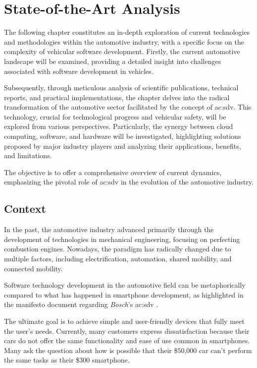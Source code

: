 
\chapter{State-of-the-Art Analysis} \label{ch:state-of-the-ArtAnalysis}
The following chapter constitutes an in-depth exploration of current technologies and methodologies within the automotive industry, with a specific focus on the complexity of vehicular software development. Firstly, the current automotive landscape will be examined, providing a detailed insight into challenges associated with software development in vehicles.

Subsequently, through meticulous analysis of scientific publications, technical reports, and practical implementations, the chapter delves into the radical transformation of the automotive sector facilitated by the concept of \gls{ac:sdv}. This technology, crucial for technological progress and vehicular safety, will be explored from various perspectives. Particularly, the synergy between cloud computing, software, and hardware will be investigated, highlighting solutions proposed by major industry players and analyzing their applications, benefits, and limitations.

The objective is to offer a comprehensive overview of current dynamics, emphasizing the pivotal role of \gls{ac:sdv} in the evolution of the automotive industry.

\section{Context}

In the past, the automotive industry advanced primarily through the development of technologies in mechanical engineering, focusing on perfecting combustion engines. Nowadays, the paradigm has radically changed due to multiple factors, including electrification, automation, shared mobility, and connected mobility.

Software technology development in the automotive field can be metaphorically compared to what has happened in smartphone development, as highlighted in the manifesto document regarding \textit{Bosch}'s \gls{ac:sdv} \cite{SDVBoschMobility}.

The ultimate goal is to achieve simple and user-friendly devices that fully meet the user's needs. Currently, many customers express dissatisfaction because their cars do not offer the same functionality and ease of use common in smartphones. Many ask the question about how is possible that their \$50,000 car can't perform the same tasks as their \$300 smartphone.


